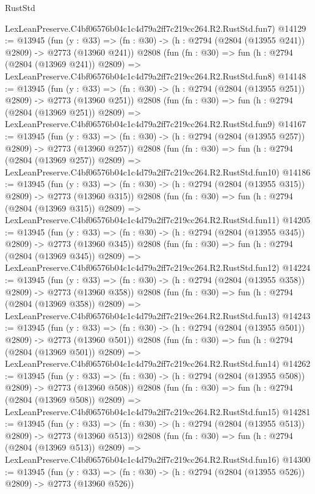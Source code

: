 \begin{lexlean}{RustStd}
\begin{coremodule}
    LexLeanPreserve.C4bf06576b04c1c4d79a2ff7c219cc264.R2.RustStd.fun7)
@14129 := @13945
    (fun (y : @33) => (fn : @30) -> (h : @2794 (@2804 (@13955 @241)) @2809) -> @2773 (@13960 @241))
    @2808
    (fun (fn : @30) =>
    fun (h : @2794 (@2804 (@13969 @241)) @2809) =>
    LexLeanPreserve.C4bf06576b04c1c4d79a2ff7c219cc264.R2.RustStd.fun8)
@14148 := @13945
    (fun (y : @33) => (fn : @30) -> (h : @2794 (@2804 (@13955 @251)) @2809) -> @2773 (@13960 @251))
    @2808
    (fun (fn : @30) =>
    fun (h : @2794 (@2804 (@13969 @251)) @2809) =>
    LexLeanPreserve.C4bf06576b04c1c4d79a2ff7c219cc264.R2.RustStd.fun9)
@14167 := @13945
    (fun (y : @33) => (fn : @30) -> (h : @2794 (@2804 (@13955 @257)) @2809) -> @2773 (@13960 @257))
    @2808
    (fun (fn : @30) =>
    fun (h : @2794 (@2804 (@13969 @257)) @2809) =>
    LexLeanPreserve.C4bf06576b04c1c4d79a2ff7c219cc264.R2.RustStd.fun10)
@14186 := @13945
    (fun (y : @33) => (fn : @30) -> (h : @2794 (@2804 (@13955 @315)) @2809) -> @2773 (@13960 @315))
    @2808
    (fun (fn : @30) =>
    fun (h : @2794 (@2804 (@13969 @315)) @2809) =>
    LexLeanPreserve.C4bf06576b04c1c4d79a2ff7c219cc264.R2.RustStd.fun11)
@14205 := @13945
    (fun (y : @33) => (fn : @30) -> (h : @2794 (@2804 (@13955 @345)) @2809) -> @2773 (@13960 @345))
    @2808
    (fun (fn : @30) =>
    fun (h : @2794 (@2804 (@13969 @345)) @2809) =>
    LexLeanPreserve.C4bf06576b04c1c4d79a2ff7c219cc264.R2.RustStd.fun12)
@14224 := @13945
    (fun (y : @33) => (fn : @30) -> (h : @2794 (@2804 (@13955 @358)) @2809) -> @2773 (@13960 @358))
    @2808
    (fun (fn : @30) =>
    fun (h : @2794 (@2804 (@13969 @358)) @2809) =>
    LexLeanPreserve.C4bf06576b04c1c4d79a2ff7c219cc264.R2.RustStd.fun13)
@14243 := @13945
    (fun (y : @33) => (fn : @30) -> (h : @2794 (@2804 (@13955 @501)) @2809) -> @2773 (@13960 @501))
    @2808
    (fun (fn : @30) =>
    fun (h : @2794 (@2804 (@13969 @501)) @2809) =>
    LexLeanPreserve.C4bf06576b04c1c4d79a2ff7c219cc264.R2.RustStd.fun14)
@14262 := @13945
    (fun (y : @33) => (fn : @30) -> (h : @2794 (@2804 (@13955 @508)) @2809) -> @2773 (@13960 @508))
    @2808
    (fun (fn : @30) =>
    fun (h : @2794 (@2804 (@13969 @508)) @2809) =>
    LexLeanPreserve.C4bf06576b04c1c4d79a2ff7c219cc264.R2.RustStd.fun15)
@14281 := @13945
    (fun (y : @33) => (fn : @30) -> (h : @2794 (@2804 (@13955 @513)) @2809) -> @2773 (@13960 @513))
    @2808
    (fun (fn : @30) =>
    fun (h : @2794 (@2804 (@13969 @513)) @2809) =>
    LexLeanPreserve.C4bf06576b04c1c4d79a2ff7c219cc264.R2.RustStd.fun16)
@14300 := @13945
    (fun (y : @33) => (fn : @30) -> (h : @2794 (@2804 (@13955 @526)) @2809) -> @2773 (@13960 @526))

\end{coremodule}
\end{lexlean}
